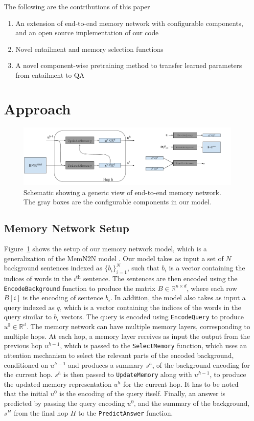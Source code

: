 \documentclass[11pt]{article}
\begin{document}
The following are the contributions of this paper
\begin{enumerate}
\item An extension of end-to-end memory network with configurable components, and an open source implementation of our code
\item Novel entailment and memory selection functions
\item A novel component-wise pretraining method to transfer learned parameters from entailment to QA
\end{enumerate}
\section{Approach}
\begin{figure}
\begin{center}
  \includegraphics[width=5in]{memory_network_generic.png}
  \caption{Schematic showing a generic view of end-to-end memory network. The gray boxes are the configurable components in our model.}
  \label{fig:memnet}
  \end{center}
\end{figure}
\subsection{Memory Network Setup}
Figure~\ref{fig:memnet} shows the setup of our memory network model, which is a generalization of the MemN2N model \cite{sukhbaatar2015end}. Our model takes as input a set of $N$ background sentences indexed as $\{b_i\}_{i=1}^N$, such that $b_i$ is a vector containing the indices of words in the $i^\text{th}$ sentence. The sentences are then encoded using the \texttt{EncodeBackground} function to produce the matrix $B \in \mathbb{R}^{n \times d}$, where each row $B[i]$ is the encoding of sentence $b_i$. In addition, the model also takes as input a query indexed as $q$, which is a vector containing the indices of the words in the query similar to $b_i$ vectors. The query is encoded using \texttt{EncodeQuery} to produce $u^0 \in \mathbb{R}^d$. The memory network can have multiple memory layers, corresponding to multiple hops. At each hop, a memory layer receives as input the output from the previous hop $u^{h-1}$, which is passed to the \texttt{SelectMemory} function, which uses an attention mechanism to select the relevant parts of the encoded background, conditioned on $u^{h-1}$ and produces a summary $s^h$, of the background encoding for the current hop. $s^h$ is then passed to \texttt{UpdateMemory} along with $u^{h-1}$, to produce the updated memory representation $u^h$ for the current hop. It has to be noted that the initial $u^0$ is the encoding of the query itself. Finally, an answer is predicted by passing the query encoding $u^0$, and the summary of the background, $s^H$ from the final hop $H$ to the \texttt{PredictAnswer} function.
\end{document}
